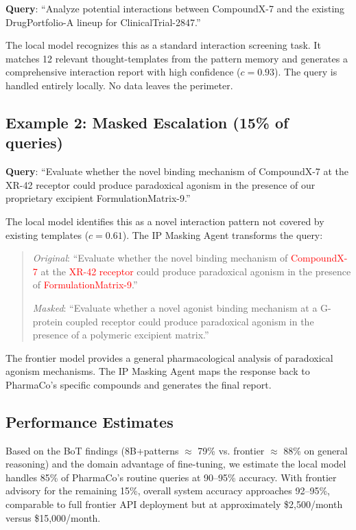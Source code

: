\documentclass[11pt,a4paper]{article}
\begin{document}
\textbf{Query}: ``Analyze potential interactions between CompoundX-7 and the existing DrugPortfolio-A lineup for ClinicalTrial-2847.''

The local model recognizes this as a standard interaction screening task. It matches 12 relevant thought-templates from the pattern memory and generates a comprehensive interaction report with high confidence ($c = 0.93$). The query is handled entirely locally. No data leaves the perimeter.

\subsection{Example 2: Masked Escalation (15\% of queries)}

\textbf{Query}: ``Evaluate whether the novel binding mechanism of CompoundX-7 at the XR-42 receptor could produce paradoxical agonism in the presence of our proprietary excipient FormulationMatrix-9.''

The local model identifies this as a novel interaction pattern not covered by existing templates ($c = 0.61$). The IP Masking Agent transforms the query:

\begin{quote}
\textit{Original}: ``Evaluate whether the novel binding mechanism of \textcolor{red}{CompoundX-7} at the \textcolor{red}{XR-42 receptor} could produce paradoxical agonism in the presence of \textcolor{red}{FormulationMatrix-9}.''

\textit{Masked}: ``Evaluate whether a novel agonist binding mechanism at a \textcolor{green!50!black}{G-protein coupled receptor} could produce paradoxical agonism in the presence of a \textcolor{green!50!black}{polymeric excipient matrix}.''
\end{quote}

The frontier model provides a general pharmacological analysis of paradoxical agonism mechanisms. The IP Masking Agent maps the response back to PharmaCo's specific compounds and generates the final report.

\subsection{Performance Estimates}

Based on the BoT findings (8B+patterns $\approx$ 79\% vs. frontier $\approx$ 88\% on general reasoning) and the domain advantage of fine-tuning, we estimate the local model handles 85\% of PharmaCo's routine queries at 90--95\% accuracy. With frontier advisory for the remaining 15\%, overall system accuracy approaches 92--95\%, comparable to full frontier API deployment but at approximately \$2,500/month versus \$15,000/month.
\end{document}
